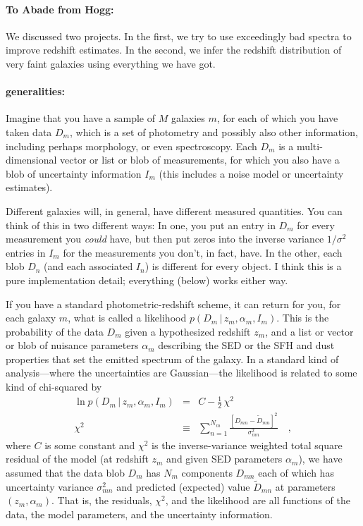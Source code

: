 \documentclass[12pt]{article}
\newcommand{\given}{\,|\,}
\begin{document}
\paragraph{To Abade from Hogg:}
We discussed two projects.  In the first, we try to use exceedingly bad
spectra to improve redshift estimates.  In the second, we infer the
redshift distribution of very faint galaxies using everything we have
got.

\paragraph{generalities:}
Imagine that you have a sample of $M$ galaxies $m$, for each of which
you have taken data $D_m$, which is a set of photometry and possibly
also other information, including perhaps morphology, or even
spectroscopy.  Each $D_m$ is a multi-dimensional vector or list or
blob of measurements, for which you also have a blob of uncertainty
information $I_m$ (this includes a noise model or uncertainty
estimates).

Different galaxies will, in general, have different measured
quantities.  You can think of this in two different ways: In one, you
put an entry in $D_m$ for every measurement you \emph{could} have, but
then put zeros into the inverse variance $1/\sigma^2$ entries in $I_m$
for the measurements you don't, in fact, have.  In the other, each
blob $D_n$ (and each associated $I_n$) is different for every object.
I think this is a pure implementation detail; everything (below) works
either way.

If you have a standard photometric-redshift scheme, it can return for
you, for each galaxy $m$, what is called a likelihood $p(D_m \given
z_m,\alpha_m,I_m)$.  This is the probability of the data $D_m$ given a
hypothesized redshift $z_m$, and a list or vector or blob of nuisance
parameters $\alpha_m$ describing the SED or the SFH and dust
properties that set the emitted spectrum of the galaxy.  In a standard
kind of analysis---where the uncertainties are Gaussian---the
likelihood is related to some kind of chi-squared by
\begin{eqnarray}\displaystyle
\ln p(D_m \given z_m, \alpha_m, I_m) &=& C-\frac{1}{2}\,\chi^2
\\
\chi^2 &\equiv& \sum_{n=1}^{N_m} \frac{[D_{mn}-\tilde{D}_{mn}]^2}{\sigma_{mn}^2}
\quad,
\end{eqnarray}
where $C$ is some constant and $\chi^2$ is the inverse-variance
weighted total square residual of the model (at redshift $z_m$ and
given SED parameters $\alpha_m$), we have assumed that the data blob
$D_m$ has $N_m$ components $D_{mn}$ each of which has uncertainty
variance $\sigma_{mn}^2$ and predicted (expected) value
$\tilde{D}_{mn}$ at parameters $(z_m, \alpha_m)$.  That is, the
residuals, $\chi^2$, and the likelihood are all functions of the data,
the model parameters, and the uncertainty information.
\end{document}
